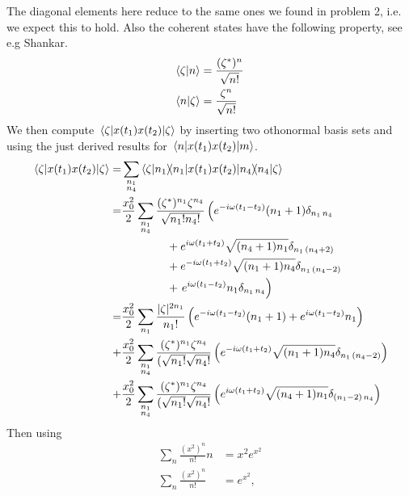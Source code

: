 \documentclass[a4paper,11pt]{article}
\begin{document}
The diagonal elements here reduce to the same ones we found in problem 2, i.e. we expect this to hold.
Also the coherent states have the following property, see e.g Shankar.
\begin{equation}
\begin{aligned}
\braket{\zeta}{n}&=\frac{(\zeta^*)^n}{\sqrt{n!}}\\
\braket{n}{\zeta}&=\frac{\zeta^n}{\sqrt{n!}}\\
\end{aligned}
\end{equation}
We then compute  $\mel{\zeta}{x(t_1)x(t_2)}{\zeta}$ by inserting two othonormal basis sets and using the just derived results for $\mel{n}{x(t_1)x(t_2)}{m}$.
\begin{equation}
	\begin{aligned}
		\mel{\zeta}{x(t_1)x(t_2)}{\zeta}=&\sum_{\substack{n_1\\n_4}}\braket{\zeta}{n_1}\hspace*{-0.2cm}\mel{n_1}{x(t_1)x(t_2)}{n_4}\hspace*{-0.15cm}\braket{n_4}{\zeta}
		\\
=&\frac{x_0^2}{2}\sum_{\substack{n_1\\n_4}}\frac{(\zeta^*)^{n_1}\zeta^{n_4}}{\sqrt{n_1!n_4!}}\left(  e^{-i\omega (t_1-t_2)}(n_1+1)\delta_{n_1\,n_4}\right.\\
&\qquad\qquad+ e^{i \omega (t_1+t_2)}\sqrt{(n_4+1)n_1}\delta_{n_1\,(n_4+2)}\\
&\qquad\qquad+ e^{-i\omega (t_1+t_2)}\sqrt{(n_1+1)n_4}\delta_{n_1\,(n_4-2)}\\
&\qquad\qquad+ \left.e^{i\omega (t_1-t_2)}n_1\delta_{n_1\,n_4}\right)
		\\
=&\frac{x_0^2}{2}\sum_{\substack{n_1}}\frac{|\zeta|^{2n_1}}{n_1!}\left(  e^{-i\omega (t_1-t_2)}(n_1+1)+e^{i\omega (t_1-t_2)}n_1\right)\\
+&\frac{x_0^2}{2}\sum_{\substack{n_1\\ n_4}}\frac{(\zeta^*)^{n_1}\zeta^{n_4}}{(\sqrt{n_1!}\sqrt{n_4!}}\left( e^{-i\omega (t_1+t_2)}\sqrt{(n_1+1)n_4}\delta_{n_1\,(n_4-2)}\right)\\
+&\frac{x_0^2}{2}\sum_{\substack{n_1\\ n_4}}\frac{(\zeta^*)^{n_1}\zeta^{n_4}}{(\sqrt{n_1!}\sqrt{n_4!}}\left(  e^{i \omega (t_1+t_2)}\sqrt{(n_4+1)n_1}\delta_{(n_1-2)\,n_4}\right)
	\end{aligned}
\end{equation}
Then using
\begin{equation}
\begin{aligned}
\sum_{n}\frac{(x^2)^n}{n!}n&=x^2e^{x^2}\\
\sum_n\frac{(x^2)^n}{n!}&=e^{x^2},
\end{aligned}
\end{equation}
\end{document}
